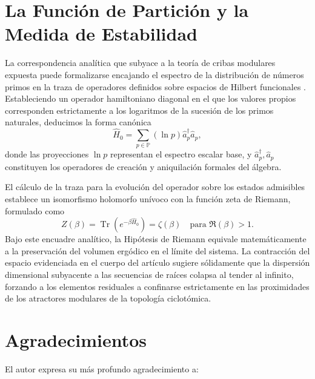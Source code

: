 \documentclass{article}
\numberwithin{equation}{section}
\theoremstyle{plain}
\theoremstyle{definition}
\begin{document}
\section{La Función de Partición y la Medida de Estabilidad}
\label{apendice:hamiltoniano_primones}

La correspondencia analítica que subyace a la teoría de cribas modulares expuesta puede formalizarse encajando el espectro de la distribución de números primos en la traza de operadores definidos sobre espacios de Hilbert funcionales \cite{Julia1990}. Estableciendo un operador hamiltoniano diagonal en el que los valores propios corresponden estrictamente a los logaritmos de la sucesión de los primos naturales, deducimos la forma canónica
\begin{equation}
    \hat{H}_0 = \sum_{p \in \mathbb{P}} (\ln p) \hat{a}_p^\dagger \hat{a}_p,
\end{equation}
donde las proyecciones $\ln p$ representan el espectro escalar base, y $\hat{a}_p^\dagger, \hat{a}_p$ constituyen los operadores de creación y aniquilación formales del álgebra.

El cálculo de la traza para la evolución del operador sobre los estados admisibles establece un isomorfismo holomorfo unívoco con la función zeta de Riemann, formulado como
\begin{equation}
    Z(\beta) = \operatorname{Tr}(e^{-\beta \hat{H}_0}) = \zeta(\beta) \quad \text{para } \Re(\beta) > 1.
\end{equation}
Bajo este encuadre analítico, la Hipótesis de Riemann equivale matemáticamente a la preservación del volumen ergódico en el límite del sistema. La contracción del espacio evidenciada en el cuerpo del artículo sugiere sólidamente que la dispersión dimensional subyacente a las secuencias de raíces colapsa al tender al infinito, forzando a los elementos residuales a confinarse estrictamente en las proximidades de los atractores modulares de la topología ciclotómica.


\section*{Agradecimientos}
El autor expresa su más profundo agradecimiento a:
\end{document}

